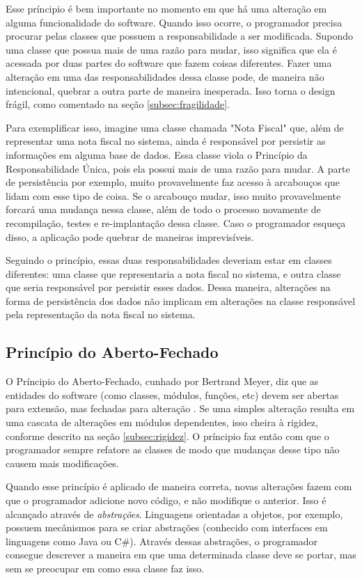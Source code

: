 Esse príncipio é bem importante no momento em que há uma alteração em alguma funcionalidade do software. Quando isso ocorre,
o programador precisa procurar pelas classes que possuem a responsabilidade a ser modificada. Supondo uma classe que 
possua mais de uma razão para mudar, isso significa que ela é acessada por duas partes do software que fazem coisas diferentes.
Fazer uma alteração em uma das responsabilidades dessa classe pode, de maneira não intencional, quebrar a outra parte
de maneira inesperada. Isso torna o design frágil, como comentado na seção \ref{subsec:fragilidade}.

Para exemplificar isso, imagine uma classe chamada "Nota Fiscal" que, além de representar uma nota fiscal no sistema, ainda
é responsável por persistir as informações em alguma base de dados. Essa classe viola o Princípio da Responsabilidade Única,
pois ela possui mais de uma razão para mudar. A parte de persistência por exemplo, muito provavelmente faz acesso à arcabouços
que lidam com esse tipo de coisa. Se o arcabouço mudar, isso muito provavelmente forcará uma mudança nessa classe, além de 
todo o processo novamente de recompilação, testes e re-implantação dessa classe. Caso o programador esqueça disso, a aplicação
pode quebrar de maneiras imprevisíveis.

Seguindo o princípio, essas duas responsabilidades deveriam estar em classes diferentes: uma classe que representaria a nota
fiscal no sistema, e outra classe que seria responsável por persistir esses dados. Dessa maneira, alterações na forma de
persistência dos dados não implicam em alterações na classe responsável pela representação da nota fiscal no sistema.

\subsection{Princípio do Aberto-Fechado}
\label{subsec:ocp}

O Príncipio do Aberto-Fechado, cunhado por Bertrand Meyer, diz que as entidades do software (como classes, módulos, funções, etc)
devem ser abertas para extensão, mas fechadas para alteração \cite{meyer-ocp}. Se uma simples alteração resulta em uma cascata
de alterações em módulos dependentes, isso cheira à rigidez, conforme descrito na seção \ref{subsec:rigidez}. O príncipio faz então
com que o programador sempre refatore as classes de modo que mudanças desse tipo não causem mais modificações.

Quando esse princípio é aplicado de maneira correta, novas alterações fazem com que o programador adicione novo código, e não
modifique o anterior. Isso é alcançado através de \textit{abstrações}. Linguagens orientadas a objetos, por exemplo, possuem
mecânismos para se criar abstrações (conhecido com interfaces em linguagens como Java ou C\#). Através dessas abstrações,
o programador consegue descrever a maneira em que uma determinada classe deve se portar, mas sem se preocupar em como
essa classe faz isso.

